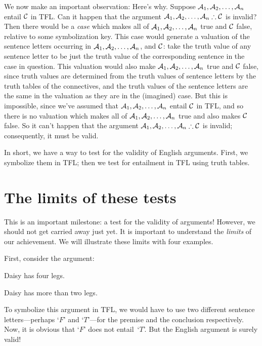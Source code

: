 We now make an important observation:
Here's why. Suppose $\mathcal{A}_1, \mathcal{A}_2, \ldots, \mathcal{A}_n$
entail $\mathcal{C}$ in TFL. Can it happen that the argument
$\metav{A}_1, \metav{A}_2, \ldots, \metav{A}_n \therefore \metav{C}$
is invalid? Then there would be a \emph{case} which makes all of
$\mathcal{A}_1, \mathcal{A}_2, \ldots, \mathcal{A}_n$ true and $\mathcal{C}$
false, relative to some symbolization key. This case would generate a
valuation of the sentence letters occurring in $\mathcal{A}_1,
\mathcal{A}_2, \ldots, \mathcal{A}_n$, and $\mathcal{C}$: take the truth
value of any sentence letter to be just the truth value of the
corresponding sentence in the case in question. This valuation would
also make $\mathcal{A}_1, \mathcal{A}_2, \ldots, \mathcal{A}_n$ true and
$\mathcal{C}$ false, since truth values are determined from the truth
values of sentence letters by the truth tables of the connectives, and
the truth values of the sentence letters are the same in the valuation
as they are in the (imagined) case. But this is impossible, since
we've assumed that $\mathcal{A}_1, \mathcal{A}_2, \ldots, \mathcal{A}_n$
entail $\mathcal{C}$ in TFL, and so there is no valuation which makes
all of $\mathcal{A}_1, \mathcal{A}_2, \ldots, \mathcal{A}_n$ true and also
makes $\mathcal{C}$ false. So it can't happen that the argument
$\metav{A}_1, \metav{A}_2, \ldots, \metav{A}_n \therefore \metav{C}$
is invalid; consequently, it must be valid.

In short, we have a way to test for the validity of English arguments. First, we symbolize them in TFL; then we test for entailment in TFL using truth tables.


\section{The limits of these tests}\label{s:ParadoxesOfMaterialConditional}
This is an important milestone: a test for the validity of arguments! However, we should not get carried away just yet. It is important to understand the \emph{limits} of our achievement. We will illustrate these limits with four examples.

First, consider the argument: 
	\begin{earg}
		\item Daisy has four legs.
		\item[\texttherefore] Daisy has more than two legs.
	\end{earg}
To symbolize this argument in TFL, we would have to use two different sentence letters---perhaps `$F$'  and `$T$'---for the premise and the conclusion respectively. Now, it is obvious that `$F$' does not entail~`$T$'. But the English argument is surely valid!

